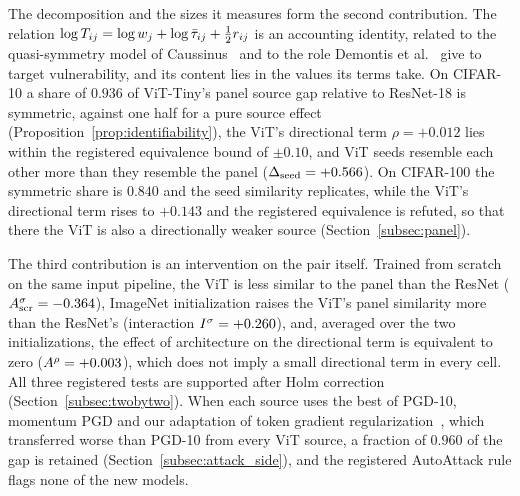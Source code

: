 The decomposition and the sizes it measures form the second contribution. The relation $\log T_{ij} = \log w_j + \log\bar{\tau}_{ij} + \tfrac{1}{2} r_{ij}$ is an accounting identity, related to the quasi-symmetry model of Caussinus~\cite{caussinus1965contribution} and to the role Demontis et al.~\cite{demontis2019adversarial} give to target vulnerability, and its content lies in the values its terms take. On CIFAR-10 a share of $0.936$ of ViT-Tiny's panel source gap relative to ResNet-18 is symmetric, against one half for a pure source effect (Proposition~\ref{prop:identifiability}), the ViT's directional term $\rho = +0.012$ lies within the registered equivalence bound of $\pm0.10$, and ViT seeds resemble each other more than they resemble the panel ($\Delta_{\mathrm{seed}} = +0.566$). On CIFAR-100 the symmetric share is $0.840$ and the seed similarity replicates, while the ViT's directional term rises to $+0.143$ and the registered equivalence is refuted, so that there the ViT is also a directionally weaker source (Section~\ref{subsec:panel}).

The third contribution is an intervention on the pair itself. Trained from scratch on the same input pipeline, the ViT is less similar to the panel than the ResNet ($A^{\sigma}_{\mathrm{scr}} = -0.364$), ImageNet initialization raises the ViT's panel similarity more than the ResNet's (interaction $I^{\sigma} = +0.260$), and, averaged over the two initializations, the effect of architecture on the directional term is equivalent to zero ($A^{\rho} = +0.003$), which does not imply a small directional term in every cell. All three registered tests are supported after Holm correction (Section~\ref{subsec:twobytwo}). When each source uses the best of PGD-10, momentum PGD and our adaptation of token gradient regularization~\cite{zhang2023tgr}, which transferred worse than PGD-10 from every ViT source, a fraction of $0.960$ of the gap is retained (Section~\ref{subsec:attack_side}), and the registered AutoAttack rule flags none of the new models.

